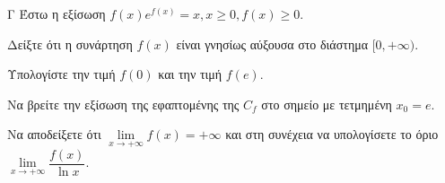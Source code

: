 \begin{thema}{Γ}
Έστω η εξίσωση $f(x) e^{f(x)} = x, x \ge 0, f(x) \ge 0$.
\begin{erwthma}
  \item Δείξτε ότι η συνάρτηση $f(x)$ είναι γνησίως αύξουσα στο διάστημα $[0, +\infty)$.
  \item Υπολογίστε την τιμή $f(0)$ και την τιμή $f(e)$. 
  \item Να βρείτε την εξίσωση της εφαπτομένης της $C_f$ στο σημείο με τετμημένη $x_0 = e$.
  \item Να αποδείξετε ότι $\lim\limits_{x \to +\infty} f(x) = +\infty$ και στη συνέχεια να υπολογίσετε το όριο $\lim\limits_{x \to +\infty} \dfrac{f(x)}{\ln x}$.
\end{erwthma}
\end{thema}
